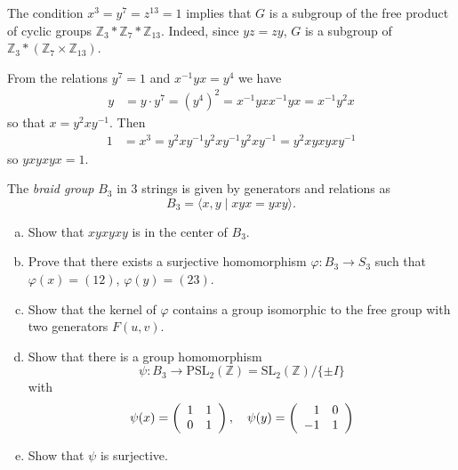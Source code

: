 \documentclass{article}
\newcounter{Problem}
\newenvironment{Problem}{\begin{Exercise}[name={Problem},
                                          counter={Problem}]}
                        {\end{Exercise}}
\begin{document}
\begin{Answer}
The condition $x^3 = y^7 = z^{13} = 1$ implies that
$G$ is a subgroup of the free product of cyclic groups
$\mathbb{Z}_3 \ast \mathbb{Z}_7 \ast \mathbb{Z}_{13}$. Indeed,
since $yz = zy$, $G$ is a subgroup of
$\mathbb{Z}_3 \ast (\mathbb{Z}_7 \times \mathbb{Z}_{13})$.

From the relations $y^7 = 1$ and $x^{-1} y x = y^4$ we have
\begin{align*}
   y
&= y \cdot y^7
 = (y^4)^2
 = x^{-1} y x x^{-1} y x
 = x^{-1} y^2 x
\end{align*}
so that $x = y^2 x y^{-1}$. Then
\begin{align*}
   1
&= x^3
 = y^2 x y^{-1} y^2 x y^{-1} y^2 x y^{-1}
 = y^2 x y x y x y^{-1}
\end{align*}
so $yxyxyx = 1$.
\end{Answer}

\pagebreak

\begin{Problem}
The \emph{braid group} $B_3$ in 3 strings is given by generators and
relations as
$$
B_3 = \langle x, y \mid xyx = yxy \rangle.
$$

\begin{enumerate}[(a)]
  \item{
    Show that $xyxyxy$ is in the center of $B_3$.
  }
  \item{
    Prove that there exists a surjective homomorphism
    $\varphi : B_3 \to S_3$ such that $\varphi(x) = (12)$,
    $\varphi(y) = (23)$.
  }
  \item{
    Show that the kernel of $\varphi$ contains a group isomorphic to
    the free group with two generators $F(u,v)$.
  }
  \item{
    Show that there is a group homomorphism
    $$
    \psi : B_3
       \to \mathrm{PSL}_2(\mathbb{Z})
         = \mathrm{SL}_2(\mathbb{Z}) / \{ \pm I \}
    $$
    with
    $$
    \psi(x) =
    \left(\begin{array}{r r}
      1 & 1 \\
      0 & 1
    \end{array}\right), \quad
    \psi(y) =
    \left(\begin{array}{r r}
      1 & 0 \\
     -1 & 1
    \end{array}\right)
    $$
  }
  \item{
    Show that $\psi$ is surjective.
  }
\end{enumerate}

\end{Problem}
\end{document}
